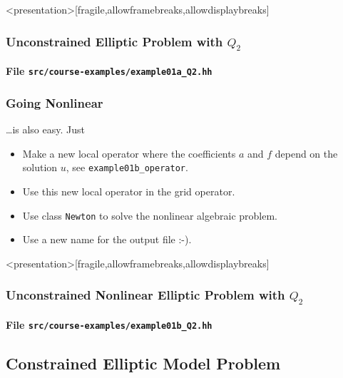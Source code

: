 \begin{frame}<presentation>[fragile,allowframebreaks,allowdisplaybreaks]
\frametitle<presentation>{Unconstrained Elliptic Problem with $Q_2$}
\framesubtitle<presentation>{File \texttt{src/course-examples/example01a\_Q2.hh}}

\end{frame}


\begin{frame}
\frametitle{Going Nonlinear}
\ldots is also easy. Just 
\begin{itemize}
\item Make a new local operator where the coefficients $a$ and $f$ depend on the solution $u$,
see \lstinline{example01b_operator}.
\item Use this new local operator in the grid operator.
\item Use class \lstinline{Newton} to solve the nonlinear algebraic problem.
\item Use a new name for the output file :-).
\end{itemize}
\end{frame}

\begin{frame}<presentation>[fragile,allowframebreaks,allowdisplaybreaks]
\frametitle<presentation>{Unconstrained Nonlinear Elliptic Problem with $Q_2$}
\framesubtitle<presentation>{File \texttt{src/course-examples/example01b\_Q2.hh}}

\end{frame}


\subsection{Constrained Elliptic Model Problem}

